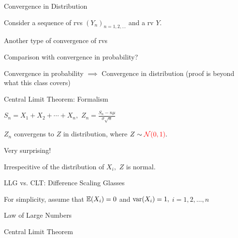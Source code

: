 \begin{frame}{Convergence in Distribution}

\plitemsep 0.1in
\bci
\item Consider a sequence of rvs $(Y_n)_{n=1,2, \ldots}$ and a rv $Y.$

{
}

\item<3-> Another type of convergence of rvs

\item<4-> Comparison with convergence in probability?
\bci
\item<5-> Convergence in probability $\implies$ Convergence in distribution (proof is beyond what this class covers)
\eci

\eci
\end{frame}

\begin{frame}{Central Limit Theorem: Formalism}


\plitemsep 0.15in
\bci
\item $S_n = X_1 + X_2 + \cdots + X_n,$ \hspace{1cm} $\displaystyle Z_n = \frac{S_n - n\mu}{\sigma \sqrt{n}}$

{
$Z_n$ convergens to $Z$ in distribution,
where $Z \sim {\color{red} \ensuremath{\mathcal N}(0,1)}.$
}

\item<2-> Very surprising!

\item<2-> Irrespecitive of the distribution of $X_i,$ $Z$ is normal.
\eci
\end{frame}

\begin{frame}{LLG vs. CLT: Difference Scaling Glasses}


\plitemsep 0.15in
\bci
\item For simplicity, assume that $\mathbb{E}( X_i )=0$ and $\text{var}( X_i ) =1,$ $i=1, 2, \ldots, n$

\item<2-> Law of Large Numbers

\item<3-> Central Limit Theorem
\eci
\end{frame}

